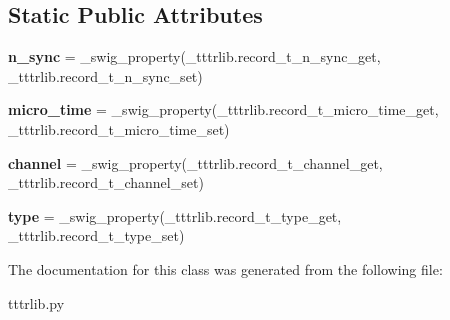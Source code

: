 \subsection*{Static Public Attributes}
\begin{DoxyCompactItemize}
\item 
\mbox{\label{classtttrlib_1_1record__t_a14768fe61c967210eaf0326f2c947078}} 
{\bfseries n\+\_\+sync} = \+\_\+swig\+\_\+property(\+\_\+tttrlib.\+record\+\_\+t\+\_\+n\+\_\+sync\+\_\+get, \+\_\+tttrlib.\+record\+\_\+t\+\_\+n\+\_\+sync\+\_\+set)
\item 
\mbox{\label{classtttrlib_1_1record__t_a1b0278e5db8e9bc67bea85826c68f927}} 
{\bfseries micro\+\_\+time} = \+\_\+swig\+\_\+property(\+\_\+tttrlib.\+record\+\_\+t\+\_\+micro\+\_\+time\+\_\+get, \+\_\+tttrlib.\+record\+\_\+t\+\_\+micro\+\_\+time\+\_\+set)
\item 
\mbox{\label{classtttrlib_1_1record__t_adf3697778c331861bd26ddc9d2d8a3c7}} 
{\bfseries channel} = \+\_\+swig\+\_\+property(\+\_\+tttrlib.\+record\+\_\+t\+\_\+channel\+\_\+get, \+\_\+tttrlib.\+record\+\_\+t\+\_\+channel\+\_\+set)
\item 
\mbox{\label{classtttrlib_1_1record__t_a12922ab15825a9d409a834288da32eb3}} 
{\bfseries type} = \+\_\+swig\+\_\+property(\+\_\+tttrlib.\+record\+\_\+t\+\_\+type\+\_\+get, \+\_\+tttrlib.\+record\+\_\+t\+\_\+type\+\_\+set)
\end{DoxyCompactItemize}


The documentation for this class was generated from the following file\+:\begin{DoxyCompactItemize}
\item 
tttrlib.\+py\end{DoxyCompactItemize}
